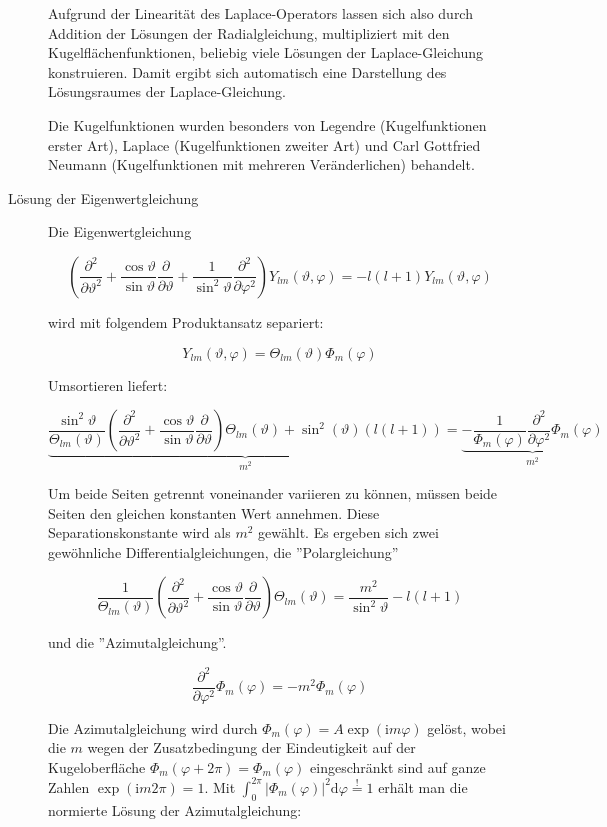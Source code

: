 \begin{definition}
\begin{description}
Aufgrund der Linearität des Laplace-Operators lassen sich also durch Addition der Lösungen der Radialgleichung, multipliziert mit den Kugelflächenfunktionen, beliebig viele Lösungen der Laplace-Gleichung konstruieren. Damit ergibt sich automatisch eine Darstellung des Lösungsraumes der Laplace-Gleichung.

Die Kugelfunktionen wurden besonders von Legendre (Kugelfunktionen erster Art), Laplace (Kugelfunktionen zweiter Art) und Carl Gottfried Neumann (Kugelfunktionen mit mehreren Veränderlichen) behandelt.

	\item[Lösung der Eigenwertgleichung]

Die Eigenwertgleichung

\[\left(\frac{\partial^{2}}{\partial\vartheta^{2}}+\frac{\cos\vartheta}{\sin\vartheta}\frac{\partial}{\partial\vartheta}+\frac{1}{\sin^{2}\vartheta}\frac{\partial^{2}}{\partial\varphi^{2}}\right)Y_{lm}(\vartheta,\varphi)=-l(l+1)Y_{lm}(\vartheta,\varphi)\]

wird mit folgendem Produktansatz separiert:

\[Y_{lm}(\vartheta,\varphi)=\Theta_{lm}(\vartheta)\Phi_{m}(\varphi)\]

Umsortieren liefert:

\[\underbrace{\frac{\sin^{2}\vartheta}{\Theta_{lm}(\vartheta)}\left(\frac{\partial^{2}}{\partial\vartheta^{2}}+\frac{\cos\vartheta}{\sin\vartheta}\frac{\partial}{\partial\vartheta}\right)\Theta_{lm}(\vartheta)+\sin^{2}(\vartheta)(l(l+1))}_{m^{2}}=\underbrace{-\frac{1}{\Phi_{m}(\varphi)}\frac{\partial^{2}}{\partial\varphi^{2}}\Phi_{m}(\varphi)}_{m^{2}}\]

Um beide Seiten getrennt voneinander variieren zu können, müssen beide Seiten den gleichen konstanten Wert annehmen. Diese Separationskonstante wird als $m^2$ gewählt. Es ergeben sich zwei gewöhnliche Differentialgleichungen, die ''Polargleichung''

\[\frac{1}{\Theta_{lm}(\vartheta)}\left(\frac{\partial^{2}}{\partial\vartheta^{2}}+\frac{\cos\vartheta}{\sin\vartheta}\frac{\partial}{\partial\vartheta}\right)\Theta_{lm}(\vartheta)=\frac{m^{2}}{\sin^{2}\vartheta}-l(l+1)\]

und die ''Azimutalgleichung''.

\[\frac{\partial^{2}}{\partial\varphi^{2}}\Phi_{m}(\varphi)=-m^{2}\Phi_{m}(\varphi)\]

Die Azimutalgleichung wird durch $\Phi_{m}(\varphi)=A\exp(\mathrm im\varphi)$ gelöst, wobei die $m$ wegen der Zusatzbedingung der Eindeutigkeit auf der Kugeloberfläche $\Phi_{m}(\varphi+2\pi)=\Phi_{m}(\varphi)$ eingeschränkt sind auf ganze Zahlen $\exp(\mathrm im2\pi)=1$. Mit $\int_{0}^{2\pi}|\Phi_{m}(\varphi)|^{2}\mathrm{d}\varphi\overset{!}{=}1$ erhält man die normierte Lösung der Azimutalgleichung:


\end{description}
\end{definition}
